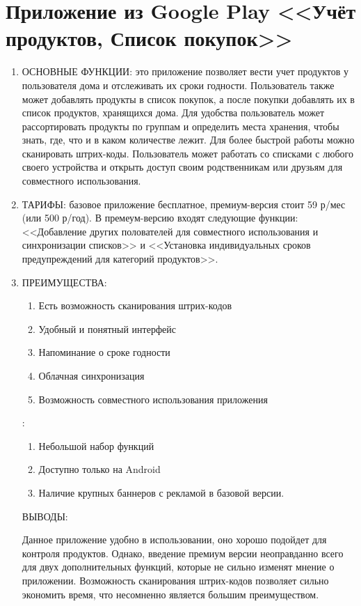 \documentclass[14pt]{extreport}
\begin{document}
\section{Приложение из Google Play <<Учёт продуктов, Список покупок>>\cite{bib1}}
\begin{enumerate}
\item ОСНОВНЫЕ ФУНКЦИИ: это приложение позволяет вести учет продуктов у пользователя дома и отслеживать их сроки годности. Пользователь также может добавлять продукты в список покупок, а после покупки добавлять их в список продуктов, хранящихся дома. Для удобства пользователь может рассортировать продукты по группам и определить места хранения, чтобы знать, где, что и в каком количестве лежит. Для более быстрой работы можно сканировать штрих-коды. Пользователь может работать со списками с любого своего устройства и открыть доступ своим родственникам или друзьям для совместного использования. 

\item ТАРИФЫ: 
базовое приложение бесплатное, премиум-версия стоит 59 р/мес (или 500 р/год). В премеум-версию входят следующие функции: <<Добавление других полователей для совместного использования и синхронизации списков>> и <<Установка индивидуальных сроков предупреждений для категорий продуктов>>.

\item ПРЕИМУЩЕСТВА: 
\begin{enumerate}
    \item Есть возможность сканирования штрих-кодов
    \item Удобный и понятный интерфейс
    \item Напоминание о сроке годности
    \item Облачная синхронизация
    \item Возможность совместного использования приложения
\end{enumerate}

: 
\begin{enumerate}
    \item Небольшой набор функций
    \item Доступно только на Android
    \item Наличие крупных баннеров с рекламой в базовой версии.
\end{enumerate}

 ВЫВОДЫ: 

Данное приложение удобно в использовании, оно хорошо подойдет для контроля продуктов. Однако, введение премиум версии неоправданно всего для двух дополнительных функций, которые не сильно изменят мнение о приложении. Возможность сканирования штрих-кодов позволяет сильно экономить время, что несомненно является большим преимуществом.
\end{enumerate}
\end{document}
